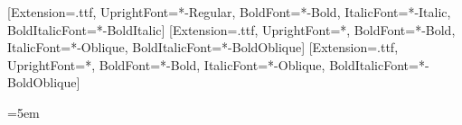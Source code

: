 \usepackage{fontspec}
\setmainfont{Tinos}[Extension=.ttf, UprightFont=*-Regular, BoldFont=*-Bold, ItalicFont=*-Italic, BoldItalicFont=*-BoldItalic]
\setsansfont{DejaVuSans}[Extension=.ttf, UprightFont=*, BoldFont=*-Bold, ItalicFont=*-Oblique, BoldItalicFont=*-BoldOblique]
\setmonofont{DejaVuSansMono}[Extension=.ttf, UprightFont=*, BoldFont=*-Bold, ItalicFont=*-Oblique, BoldItalicFont=*-BoldOblique]

\usepackage[russian,english]{babel}


\usepackage[a4paper,left=25mm,right=15mm,top=20mm,bottom=20mm]{geometry}
\usepackage{setspace}
\onehalfspacing
\usepackage{indentfirst}
\setlength{\parindent}{1.25cm}
\setlength{\parskip}{6pt}

\usepackage{microtype}
\usepackage{csquotes}
\usepackage{amsmath}
\usepackage{amssymb}
\usepackage{graphicx}
\usepackage{xcolor}
\usepackage{float}
\usepackage{array}
\usepackage{booktabs}
\usepackage{longtable}
\usepackage{tabularx}
\usepackage{adjustbox}
\usepackage{xurl}
\usepackage{hyphenat}
\usepackage{caption}
\captionsetup[table]{position=top,labelsep=emdash,justification=raggedright,singlelinecheck=false}

\addto\captionsenglish{\renewcommand{\tablename}{Table}}


\usepackage{enumitem}
\usepackage{fancyhdr}
\pagestyle{plain}
\usepackage{titlesec}
\titleformat{\section}{\bfseries\large}{\thesection}{0.6em}{}
\titleformat{\subsection}{\bfseries}{\thesubsection}{0.6em}{}

\emergencystretch=5em

\usepackage{hyperref}
\hypersetup{unicode=true,breaklinks=true,colorlinks=true,linkcolor=black,urlcolor=blue,citecolor=blue}



